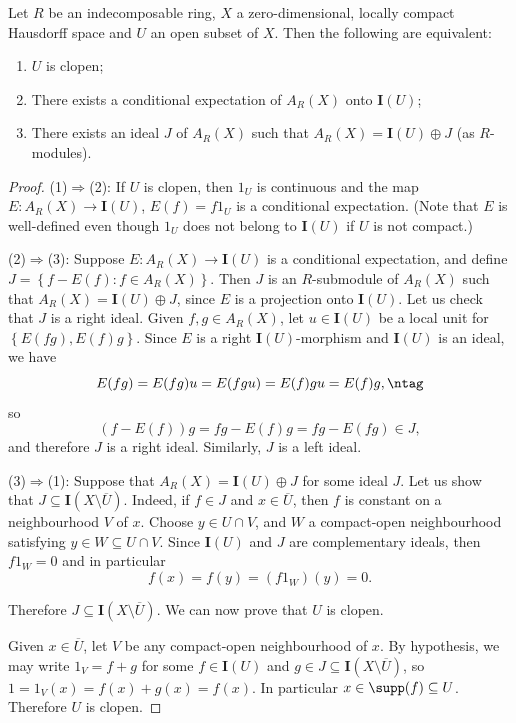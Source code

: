 \begin{lemma}\label{lemmaidealsofclopens}
Let $R$ be an indecomposable ring, $X$ a zero-dimensional, locally compact Hausdorff space and $U$ an open subset of $X$. Then the following are equivalent:
\begin{enumerate}
\item[(1)] $U$ is clopen;
\item[(2)] There exists a conditional expectation of $A_R(X)$ onto $\mathbf{I}(U)$;
\item[(3)] There exists an ideal $J$ of $A_R(X)$ such that $A_R(X)=\mathbf{I}(U)\oplus J$ (as $R$-modules).
\end{enumerate}
\end{lemma}
\begin{proof}
(1)$\Rightarrow$(2): If $U$ is clopen, then $1_U$ is continuous and the map $E:A_R(X)\to\mathbf{I}(U)$, $E(f)=f1_U$ is a conditional expectation. (Note that $E$ is well-defined even though $1_U$ does not belong to $\mathbf{I}(U)$ if $U$ is not compact.)

(2)$\Rightarrow$(3): Suppose $E:A_R(X)\to\mathbf{I}(U)$ is a conditional expectation, and define $J=\left\{f-E(f):f\in A_R(X)\right\}$. Then $J$ is an $R$-submodule of $A_R(X)$ such that $A_R(X)=\mathbf{I}(U)\oplus J$, since $E$ is a projection onto $\mathbf{I}(U)$. Let us check that $J$ is a right ideal. Given $f,g\in A_R(X)$, let $u\in\mathbf{I}(U)$ be a local unit for $\left\{E(fg),E(f)g\right\}$. Since $E$ is a right $\mathbf{I}(U)$-morphism and $\mathbf{I}(U)$ is an ideal, we have
\[E(fg)=E(fg)u=E(fgu)=E(f)gu=E(f)g,\ntag\label{equationconditionalexpectationismorphism}\]
so
\[(f-E(f))g=fg-E(f)g=fg-E(fg)\in J,\]
and therefore $J$ is a right ideal. Similarly, $J$ is a left ideal.

(3)$\Rightarrow$(1): Suppose that $A_R(X)=\mathbf{I}(U)\oplus J$ for some ideal $J$. Let us show that $J\subseteq\mathbf{I}(X\setminus\overline{U})$. Indeed, if $f\in J$ and $x\in\overline{U}$, then $f$ is constant on a neighbourhood $V$ of $x$. Choose $y\in U\cap V$, and $W$ a compact-open neighbourhood satisfying $y\in W\subseteq U\cap V$. Since $\mathbf{I}(U)$ and $J$ are complementary ideals, then $f1_W=0$ and in particular
\[f(x)=f(y)=(f1_W)(y)=0.\]

Therefore $J\subseteq\mathbf{I}(X\setminus\overline{U})$. We can now prove that $U$ is clopen.

Given $x\in\overline{U}$, let $V$ be any compact-open neighbourhood of $x$. By hypothesis, we may write $1_V=f+g$ for some $f\in\mathbf{I}(U)$ and $g\in J\subseteq\mathbf{I}(X\setminus\overline{U})$, so $1=1_V(x)=f(x)+g(x)=f(x)$. In particular $x\in\supp(f)\subseteq U$. Therefore $U$ is clopen.\qedhere
\end{proof}

